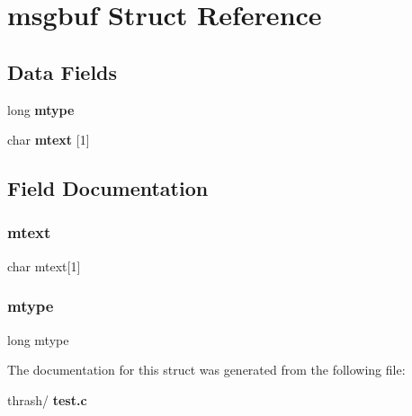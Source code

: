 \section{msgbuf Struct Reference}
\label{structmsgbuf}
\subsection*{Data Fields}
\begin{DoxyCompactItemize}
\item 
long \textbf{ mtype}
\item 
char \textbf{ mtext} [1]
\end{DoxyCompactItemize}


\subsection{Field Documentation}
\mbox{\label{structmsgbuf_a25caee4909ab47dffbf18c639cb7f833}} 
\subsubsection{mtext}
{\footnotesize\ttfamily char mtext[1]}

\mbox{\label{structmsgbuf_a6e71692f0e74d6cd516fa62386afcfb4}} 
\subsubsection{mtype}
{\footnotesize\ttfamily long mtype}



The documentation for this struct was generated from the following file\+:\begin{DoxyCompactItemize}
\item 
thrash/\textbf{ test.\+c}\end{DoxyCompactItemize}
